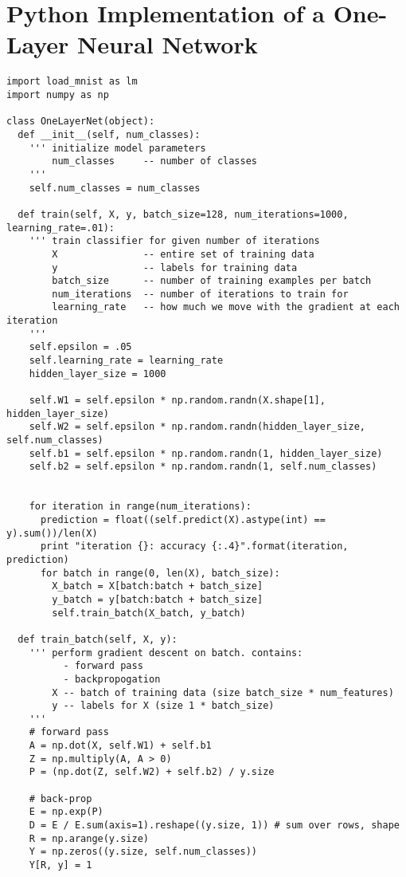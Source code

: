 \newpage
\section{Python Implementation of a One-Layer Neural Network}
\begin{verbatim}
import load_mnist as lm
import numpy as np

class OneLayerNet(object):
  def __init__(self, num_classes):
    ''' initialize model parameters
        num_classes     -- number of classes
    '''
    self.num_classes = num_classes
  
  def train(self, X, y, batch_size=128, num_iterations=1000, learning_rate=.01):
    ''' train classifier for given number of iterations
        X               -- entire set of training data
        y               -- labels for training data
        batch_size      -- number of training examples per batch
        num_iterations  -- number of iterations to train for
        learning_rate   -- how much we move with the gradient at each iteration
    '''
    self.epsilon = .05
    self.learning_rate = learning_rate
    hidden_layer_size = 1000

    self.W1 = self.epsilon * np.random.randn(X.shape[1], hidden_layer_size)
    self.W2 = self.epsilon * np.random.randn(hidden_layer_size, self.num_classes)
    self.b1 = self.epsilon * np.random.randn(1, hidden_layer_size)
    self.b2 = self.epsilon * np.random.randn(1, self.num_classes)
    

    for iteration in range(num_iterations):
      prediction = float((self.predict(X).astype(int) == y).sum())/len(X)
      print "iteration {}: accuracy {:.4}".format(iteration, prediction)
      for batch in range(0, len(X), batch_size):
        X_batch = X[batch:batch + batch_size]
        y_batch = y[batch:batch + batch_size]
        self.train_batch(X_batch, y_batch)
  
  def train_batch(self, X, y):
    ''' perform gradient descent on batch. contains:
          - forward pass
          - backpropogation
        X -- batch of training data (size batch_size * num_features)
        y -- labels for X (size 1 * batch_size)
    '''
    # forward pass
    A = np.dot(X, self.W1) + self.b1
    Z = np.multiply(A, A > 0)
    P = (np.dot(Z, self.W2) + self.b2) / y.size

    # back-prop
    E = np.exp(P)
    D = E / E.sum(axis=1).reshape((y.size, 1)) # sum over rows, shape
    R = np.arange(y.size)
    Y = np.zeros((y.size, self.num_classes))
    Y[R, y] = 1


\end{verbatim}
